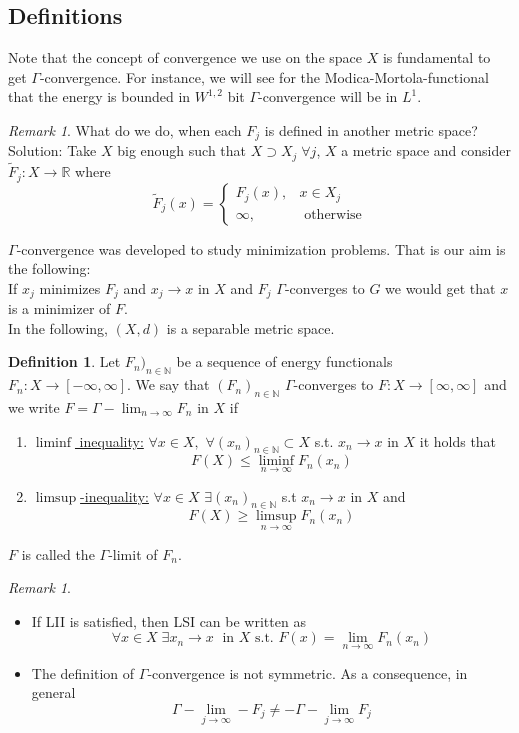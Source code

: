 \documentclass[a4paper, 12pt]{article}
\theoremstyle{plain}
\theoremstyle{definition}
\newtheorem{definition}[theorem]{Definition} %
\theoremstyle{lemma}
\theoremstyle{remark}
\newtheorem{remark}[theorem]{Remark}
\theoremstyle{corollary}
\theoremstyle{example}
\begin{document}
\subsection{Definitions}
	Note that the concept of convergence we use on the space $X$ is fundamental to get $\Gamma$-convergence. For instance, we will see for the Modica-Mortola-functional that the energy is bounded in $W^{1,2}$ bit $\Gamma$-convergence will be in $L^1$.
	\begin{remark}
		What do we do, when each $F_j$ is defined in another metric space?\\
		Solution: Take $X$ big enough such that $X \supset X_j \; \forall j$, $X$ a metric space and consider $\tilde{F}_j : X \to \mathbb{R}$ where \[\tilde{F}_j(x) = \begin{cases}
			F_j(x), & x \in X_j\\
			\infty, & \text{ otherwise}
		\end{cases}\]
	\end{remark}
	$\Gamma$-convergence was developed to study minimization problems. That is our aim is the following:\\
	If $x_j$ minimizes $F_j$ and $x_j \to x$ in $X$ and $F_j$ $\Gamma$-converges to $G$ we would get that $x$ is a minimizer of $F$.\\
	In the following, $(X,d)$ is a separable metric space.
	\begin{definition}
		Let $F_n)_{n \in \mathbb{N}}$ be a sequence of energy functionals $F_n: X \to [-\infty,\infty]$. We say that $(F_n)_{n \in \mathbb{N}}$ $\Gamma$-converges to $F: X \to [\infty,\infty]$ and we write $F = \Gamma-\lim_{n \to \infty} F_n$ in $X$ if \begin{enumerate}
			\item \underline{$\liminf$ inequality:} $\forall x \in X,$ $\forall (x_n)_{n \in \mathbb{N}} \subset X$ s.t. $x_n \to x$ in $X$ it holds that \[F(X) \leq \liminf_{n \to \infty} F_n(x_n)\]
			\item \underline{$\limsup$-inequality:} $\forall x \in X$ $\exists (x_n)_{n \in \mathbb{N}}$ s.t $x_n \to x$ in $X$ and \[F(X) \geq \limsup_{n \to \infty} F_n(x_n)\] 
		\end{enumerate}
		$F$ is called the $\Gamma$-limit of $F_n$.
	\end{definition}
	\begin{remark}
		\begin{itemize}
			\item If LII is satisfied, then LSI can be written as \[\forall x \in X \; \exists x_n \to x \; \text{ in } X \text{ s.t. } F(x) = \lim_{n\to \infty} F_n(x_n)\]
			\item The definition of $\Gamma$-convergence is not symmetric. As a consequence, in general \[\Gamma-\lim_{j \to \infty} -F_j \neq -\Gamma-\lim_{j \to \infty} F_j\]
		\end{itemize}
	\end{remark}
\end{document}
